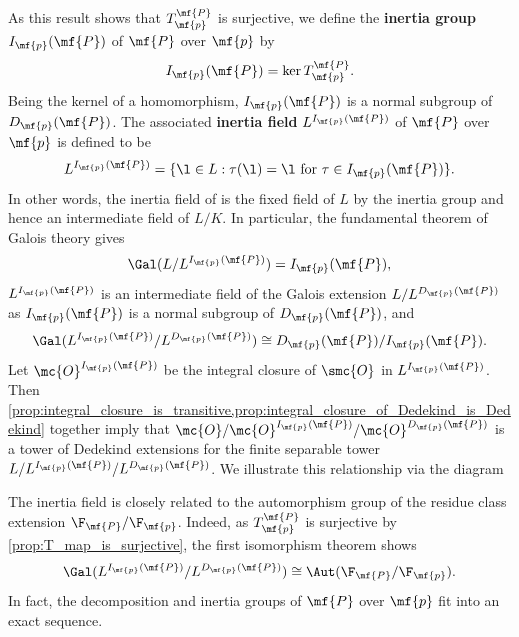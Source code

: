     As this result shows that \(T_{\mf{p}}^{\mf{P}}\) is surjective, we define the \textbf{inertia group} \(I_{\mf{p}}(\mf{P})\) of \(\mf{P}\)  over \(\mf{p}\) by
    \[
      I_{\mf{p}}(\mf{P}) = \ker{T_{\mf{p}}^{\mf{P}}}.
    \]
    Being the kernel of a homomorphism, \(I_{\mf{p}}(\mf{P})\) is a normal subgroup of \(D_{\mf{p}}(\mf{P})\). The associated \textbf{inertia field} \(L^{I_{\mf{p}}(\mf{P})}\) of \(\mf{P}\) over \(\mf{p}\) is defined to be
    \[
      L^{I_{\mf{p}}(\mf{P})} = \{\l \in L:\tau(\l) = \l \text{ for } \tau \in I_{\mf{p}}(\mf{P})\}.
    \]
    In other words, the inertia field of is the fixed field of \(L\) by the inertia group and hence an intermediate field of \(L/K\). In particular, the fundamental theorem of Galois theory gives
    \[
      \Gal(L/L^{I_{\mf{p}}(\mf{P})}) = I_{\mf{p}}(\mf{P}),
    \]
    \(L^{I_{\mf{p}}(\mf{P})}\) is an intermediate field of the Galois extension \(L/L^{D_{\mf{p}}(\mf{P})}\) as \(I_{\mf{p}}(\mf{P})\) is a normal subgroup of \(D_{\mf{p}}(\mf{P})\), and
    \[
      \Gal(L^{I_{\mf{p}}(\mf{P})}/L^{D_{\mf{p}}(\mf{P})}) \cong D_{\mf{p}}(\mf{P})/I_{\mf{p}}(\mf{P}).
    \]
    Let \(\mc{O}^{I_{\mf{p}}(\mf{P})}\) be the integral closure of \(\smc{O}\) in \(L^{I_{\mf{p}}(\mf{P})}\). Then \cref{prop:integral_closure_is_transitive,prop:integral_closure_of_Dedekind_is_Dedekind} together imply that \(\mc{O}/\mc{O}^{I_{\mf{p}}(\mf{P})}/\mc{O}^{D_{\mf{p}}(\mf{P})}\) is a tower of Dedekind extensions for the finite separable tower \(L/L^{I_{\mf{p}}(\mf{P})}/L^{D_{\mf{p}}(\mf{P})}\). We illustrate this relationship via the diagram
    \begin{center}
    \end{center}
    The inertia field is closely related to the automorphism group of the residue class extension \(\F_{\mf{P}}/\F_{\mf{p}}\). Indeed, as \(T_{\mf{p}}^{\mf{P}}\) is surjective by \cref{prop:T_map_is_surjective}, the first isomorphism theorem shows
    \[
      \Gal(L^{I_{\mf{p}}(\mf{P})}/L^{D_{\mf{p}}(\mf{P})}) \cong \Aut(\F_{\mf{P}}/\F_{\mf{p}}).
    \]
    In fact, the decomposition and inertia groups of \(\mf{P}\) over \(\mf{p}\) fit into an exact sequence.


